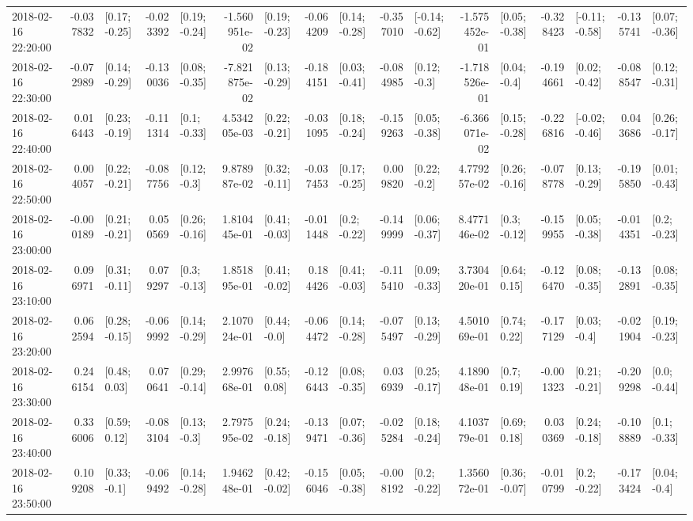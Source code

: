 \begin{tabular}{lrlrlrlrlrlrlrlrl}
2018-02-16 22:20:00 & -0.037832 &   [0.17; -0.25] & -0.023392 &   [0.19; -0.24] & -1.560951e-02 &   [0.19; -0.23] & -0.064209 &   [0.14; -0.28] & -0.357010 &  [-0.14; -0.62] & -1.575452e-01 &   [0.05; -0.38] & -0.328423 &  [-0.11; -0.58] & -0.135741 &   [0.07; -0.36] \\
2018-02-16 22:30:00 & -0.072989 &   [0.14; -0.29] & -0.130036 &   [0.08; -0.35] & -7.821875e-02 &   [0.13; -0.29] & -0.184151 &   [0.03; -0.41] & -0.084985 &    [0.12; -0.3] & -1.718526e-01 &    [0.04; -0.4] & -0.194661 &   [0.02; -0.42] & -0.088547 &   [0.12; -0.31] \\
2018-02-16 22:40:00 &  0.016443 &   [0.23; -0.19] & -0.111314 &    [0.1; -0.33] &  4.534205e-03 &   [0.22; -0.21] & -0.031095 &   [0.18; -0.24] & -0.159263 &   [0.05; -0.38] & -6.366071e-02 &   [0.15; -0.28] & -0.226816 &  [-0.02; -0.46] &  0.043686 &   [0.26; -0.17] \\
2018-02-16 22:50:00 &  0.004057 &   [0.22; -0.21] & -0.087756 &    [0.12; -0.3] &  9.878987e-02 &   [0.32; -0.11] & -0.037453 &   [0.17; -0.25] &  0.009820 &    [0.22; -0.2] &  4.779257e-02 &   [0.26; -0.16] & -0.078778 &   [0.13; -0.29] & -0.195850 &   [0.01; -0.43] \\
2018-02-16 23:00:00 & -0.000189 &   [0.21; -0.21] &  0.050569 &   [0.26; -0.16] &  1.810445e-01 &   [0.41; -0.03] & -0.011448 &    [0.2; -0.22] & -0.149999 &   [0.06; -0.37] &  8.477146e-02 &    [0.3; -0.12] & -0.159955 &   [0.05; -0.38] & -0.014351 &    [0.2; -0.23] \\
2018-02-16 23:10:00 &  0.096971 &   [0.31; -0.11] &  0.079297 &    [0.3; -0.13] &  1.851895e-01 &   [0.41; -0.02] &  0.184426 &   [0.41; -0.03] & -0.115410 &   [0.09; -0.33] &  3.730420e-01 &    [0.64; 0.15] & -0.126470 &   [0.08; -0.35] & -0.132891 &   [0.08; -0.35] \\
2018-02-16 23:20:00 &  0.062594 &   [0.28; -0.15] & -0.069992 &   [0.14; -0.29] &  2.107024e-01 &    [0.44; -0.0] & -0.064472 &   [0.14; -0.28] & -0.075497 &   [0.13; -0.29] &  4.501069e-01 &    [0.74; 0.22] & -0.177129 &    [0.03; -0.4] & -0.021904 &   [0.19; -0.23] \\
2018-02-16 23:30:00 &  0.246154 &    [0.48; 0.03] &  0.070641 &   [0.29; -0.14] &  2.997668e-01 &    [0.55; 0.08] & -0.126443 &   [0.08; -0.35] &  0.036939 &   [0.25; -0.17] &  4.189048e-01 &     [0.7; 0.19] & -0.001323 &   [0.21; -0.21] & -0.209298 &    [0.0; -0.44] \\
2018-02-16 23:40:00 &  0.336006 &    [0.59; 0.12] & -0.083104 &    [0.13; -0.3] &  2.797595e-02 &   [0.24; -0.18] & -0.139471 &   [0.07; -0.36] & -0.025284 &   [0.18; -0.24] &  4.103779e-01 &    [0.69; 0.18] &  0.030369 &   [0.24; -0.18] & -0.108889 &    [0.1; -0.33] \\
2018-02-16 23:50:00 &  0.109208 &    [0.33; -0.1] & -0.069492 &   [0.14; -0.28] &  1.946248e-01 &   [0.42; -0.02] & -0.156046 &   [0.05; -0.38] & -0.008192 &    [0.2; -0.22] &  1.356072e-01 &   [0.36; -0.07] & -0.010799 &    [0.2; -0.22] & -0.173424 &    [0.04; -0.4] \\
\bottomrule
\end{tabular}
